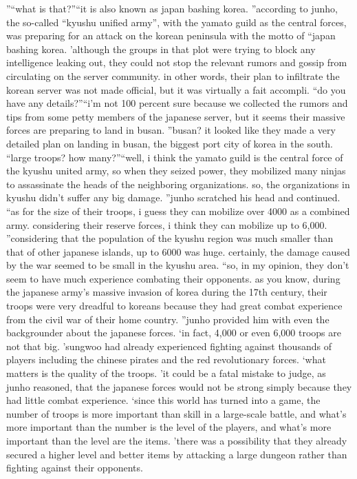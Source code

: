 ”“what is that?”“it is also known as japan bashing korea.
”according to junho, the so-called “kyushu unified army”, with the yamato guild as the central forces, was preparing for an attack on the korean peninsula with the motto of “japan bashing korea.
’although the groups in that plot were trying to block any intelligence leaking out, they could not stop the relevant rumors and gossip from circulating on the server community.
in other words, their plan to infiltrate the korean server was not made official, but it was virtually a fait accompli.
“do you have any details?”“i’m not 100 percent sure because we collected the rumors and tips from some petty members of the japanese server, but it seems their massive forces are preparing to land in busan.
”busan? it looked like they made a very detailed plan on landing in busan, the biggest port city of korea in the south.
“large troops? how many?”“well, i think the yamato guild is the central force of the kyushu united army, so when they seized power, they mobilized many ninjas to assassinate the heads of the neighboring organizations.
 so, the organizations in kyushu didn’t suffer any big damage.
”junho scratched his head and continued.
“as for the size of their troops, i guess they can mobilize over 4000 as a combined army.
 considering their reserve forces, i think they can mobilize up to 6,000.
”considering that the population of the kyushu region was much smaller than that of other japanese islands, up to 6000 was huge.
 certainly, the damage caused by the war seemed to be small in the kyushu area.
“so, in my opinion, they don’t seem to have much experience combating their opponents.
 as you know, during the japanese army’s massive invasion of korea during the 17th century, their troops were very dreadful to koreans because they had great combat experience from the civil war of their home country.
”junho provided him with even the backgrounder about the japanese forces.
‘in fact, 4,000 or even 6,000 troops are not that big.
’sungwoo had already experienced fighting against thousands of players including the chinese pirates and the red revolutionary forces.
‘what matters is the quality of the troops.
’it could be a fatal mistake to judge, as junho reasoned, that the japanese forces would not be strong simply because they had little combat experience.
‘since this world has turned into a game, the number of troops is more important than skill in a large-scale battle, and what’s more important than the number is the level of the players, and what’s more important than the level are the items.
’there was a possibility that they already secured a higher level and better items by attacking a large dungeon rather than fighting against their opponents.
